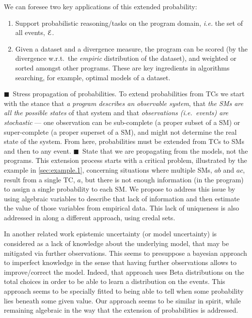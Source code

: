 \documentclass{article}
\newcommand{\cla}[1]{\ensuremath{{\cal #1}}}
\newcommand{\EVENTSset}{\ensuremath{\cla{E}}}
\newcommand{\LOOK}{\ensuremath{\blacksquare}}
\newcommand{\franc}[1]{{\color{green!30!black}#1}}
\newcommand{\bruno}{\color{red!60!black}}
\newcounter{remark}
\newcommand{\remark}[2]{%
	\stepcounter{remark}%
	\!{\color{red}/\!}%
	#1%
	{\!\color{red}/}\footnotemark[\arabic{remark}]%
	\footnotetext[\arabic{remark}]{{\color{red}/}#2}%
	}
\newcommand{\note}[1]{
	\stepcounter{remark}%
	{\!\!\color{red}/}\footnotemark[\arabic{remark}]\!\!%
	\footnotetext[\arabic{remark}]{{\color{red}/}#1}
}
\begin{document}
%
%


%
%
%

We can foresee two key applications of this extended probability:
\begin{enumerate}
\item Support probabilistic reasoning/tasks on the program domain,
  \textit{i.e.} the set of all events, $\EVENTSset$.
\item Given a dataset and a divergence measure, the program can be
  scored (by the divergence w.r.t.\ the \emph{empiric} distribution of
  the dataset), and weighted or sorted amongst other programs.  These
  are key ingredients in algorithms searching, for example, optimal
  models of a dataset.
\end{enumerate}

\franc{\LOOK~Stress propagation of probabilities.} To extend probabilities from \aclp{TC} we start with the stance that
\emph{a program describes an observable system}, that \emph{the
  \aclp{SM} are all the possible states} of that system and that
\emph{observations (i.e.\ events) are stochastic} --- one observation
can be sub-complete (a proper subset of a \ac{SM}) or super-complete
(a proper superset of a \ac{SM}),
and might not determine the real state of the system.  From here,
probabilities must be extended from \acp{TC} to \acp{SM} and then to
any event. \franc{\LOOK~State that we are propagating from the models, not the programs.}
%
This extension process starts with a critical problem, illustrated by
the example in \cref{sec:example.1}, concerning situations where
multiple \acp{SM}, $ab$ and $ac$, result from a single \ac{TC}, $a$,
but there is not enough information (in the program) to assign a
single probability to each \ac{SM}.  We propose to address this issue
by using algebraic variables to describe that lack of information and
then estimate the value of those variables from empirical data.  This
lack of uniqueness is also addressed in \cite{cozman2020joy} along a
different approach, using credal sets.

In another related work \cite{verreet2022inference} epistemic
uncertainty (or model uncertainty) is considered as a lack of
knowledge about the underlying model, that may be mi\-ti\-ga\-ted via
further observations.  This seems to presuppose a bayesian approach to
imperfect knowledge in the sense that having further observations
allows to improve/correct the model.  Indeed, that approach uses Beta
distributions on the total choices in order to be able to learn a
distribution on the
events. %
This approach seems to be specially fitted to being able to tell when
some probability lies beneath some given value.  Our approach seems to
be similar in spirit, while remaining algebraic in the way that the
extension of probabilities is addressed.
\end{document}
